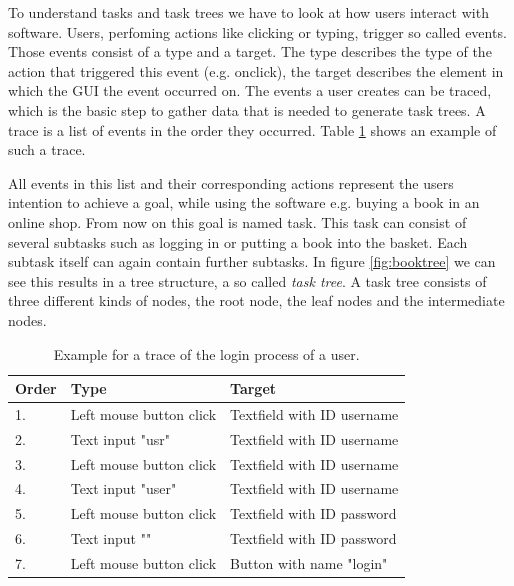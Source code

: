 To understand tasks and task trees we have to look at how users interact with software.
Users, perfoming actions like clicking or typing, trigger so called events.
Those events consist of a type and a target.
The type describes the type of the action that triggered this event (e.g. onclick), the target describes the element in which the GUI the event occurred on.
The events a user creates can be traced, which is the basic step to gather data that is needed to generate task trees.
A trace is a list of events in the order they occurred. 
Table \ref{tab:trace} shows an example of such a trace.

All events in this list and their corresponding actions represent the users intention to achieve a goal, while using the software e.g. buying a book in an online shop. 
From now on this goal is named task. 
This task can consist of several subtasks such as logging in or putting a book into the basket.
Each subtask itself can again contain further subtasks. 
In figure \ref{fig:booktree} we can see this results in a tree structure, a so called \textit{task tree}.
A task tree consists of three different kinds of nodes, the root node, the leaf nodes and the intermediate nodes.

\begin{table}[h]
\begin{center}
 \begin{tabular}{l|l|l}
	   Order & Type & Target \\
	 \hline
	 \hline
	   1. & Left mouse button click &  Textfield with ID username \\
	   2. & Text input "usr" &  Textfield with ID username \\
	   3. & Left mouse button click &  Textfield with ID username \\
	   4. & Text input "user" &  Textfield with ID username \\
	   5. &Left mouse button click &  Textfield with ID password \\
	   6. & Text input "" &  Textfield with ID password \\
	   7. &Left mouse button click &  Button with name "login" \\
	  \end{tabular}
  \end{center}
  \caption{Example for a trace of the login process of a user\cite{harms2013}.}
  \label{tab:trace}
  \end{table}

